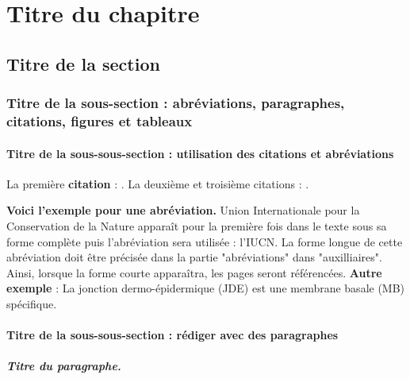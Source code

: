\chapter{Titre du chapitre} %

\section{Titre de la section}


\subsection{Titre de la sous-section : abréviations, paragraphes, citations, figures et tableaux}
\subsubsection{Titre de la sous-sous-section : utilisation des citations et abréviations}

La première \textbf{citation} : \cite{Ruppell1842}. %
La deuxième et troisième citations : \cite{Faulkes2013,Faulkes2021}.

\textbf{Voici l'exemple pour une abréviation.}
Union Internationale pour la Conservation de la Nature apparaît pour la première fois dans le texte sous sa forme complète puis l'abréviation sera utilisée : l’\acrshort{IUCN}. La forme longue de cette abréviation doit être précisée dans la partie "abréviations" dans "auxilliaires". Ainsi, lorsque la forme courte apparaîtra, les pages seront référencées.
\textbf{Autre exemple }: La jonction dermo-épidermique (\acrshort{JDE}) est une membrane basale (\acrshort{MB}) spécifique.


\subsubsection{Titre de la sous-sous-section : rédiger avec des paragraphes}

\paragraph{Titre du paragraphe.} 

\lipsum[60]

